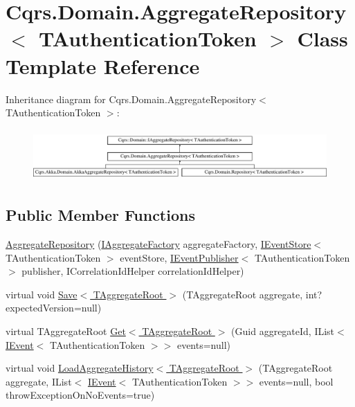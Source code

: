 \hypertarget{classCqrs_1_1Domain_1_1AggregateRepository}{}\section{Cqrs.\+Domain.\+Aggregate\+Repository$<$ T\+Authentication\+Token $>$ Class Template Reference}
\label{classCqrs_1_1Domain_1_1AggregateRepository}
Inheritance diagram for Cqrs.\+Domain.\+Aggregate\+Repository$<$ T\+Authentication\+Token $>$\+:\begin{figure}[H]
\begin{center}
\leavevmode
\includegraphics[height=2.000000cm]{classCqrs_1_1Domain_1_1AggregateRepository}
\end{center}
\end{figure}
\subsection*{Public Member Functions}
\begin{DoxyCompactItemize}
\item 
\hyperlink{classCqrs_1_1Domain_1_1AggregateRepository_ae4a6c96b10c536a0df6a381659f87744}{Aggregate\+Repository} (\hyperlink{interfaceCqrs_1_1Domain_1_1Factories_1_1IAggregateFactory}{I\+Aggregate\+Factory} aggregate\+Factory, \hyperlink{interfaceCqrs_1_1Events_1_1IEventStore}{I\+Event\+Store}$<$ T\+Authentication\+Token $>$ event\+Store, \hyperlink{interfaceCqrs_1_1Events_1_1IEventPublisher}{I\+Event\+Publisher}$<$ T\+Authentication\+Token $>$ publisher, I\+Correlation\+Id\+Helper correlation\+Id\+Helper)
\item 
virtual void \hyperlink{classCqrs_1_1Domain_1_1AggregateRepository_aff9e828d19a091a4275f635bee4b3c9b}{Save$<$ T\+Aggregate\+Root $>$} (T\+Aggregate\+Root aggregate, int? expected\+Version=null)
\item 
virtual T\+Aggregate\+Root \hyperlink{classCqrs_1_1Domain_1_1AggregateRepository_a0e55881812d463129df34189d29544b6}{Get$<$ T\+Aggregate\+Root $>$} (Guid aggregate\+Id, I\+List$<$ \hyperlink{interfaceCqrs_1_1Events_1_1IEvent}{I\+Event}$<$ T\+Authentication\+Token $>$$>$ events=null)
\item 
virtual void \hyperlink{classCqrs_1_1Domain_1_1AggregateRepository_af26efcb464ac989962a9ad138466e4d7}{Load\+Aggregate\+History$<$ T\+Aggregate\+Root $>$} (T\+Aggregate\+Root aggregate, I\+List$<$ \hyperlink{interfaceCqrs_1_1Events_1_1IEvent}{I\+Event}$<$ T\+Authentication\+Token $>$$>$ events=null, bool throw\+Exception\+On\+No\+Events=true)
\end{DoxyCompactItemize}
